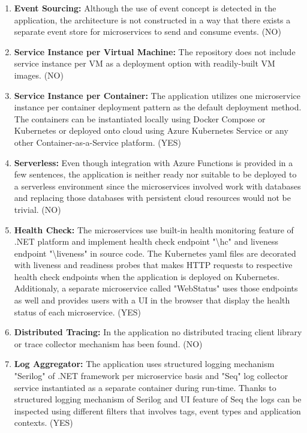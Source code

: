 \documentclass{Configuration_Files/PoliMi3i_thesis}
\begin{document}
\begin{enumerate}
    \item \textbf{Event Sourcing:} Although the use of event concept is detected in the application, the architecture is not constructed in a way that there exists a separate event store for microservices to send and consume events. (NO)
    
    \item \textbf{Service Instance per Virtual Machine:} The repository does not include service instance per VM as a deployment option with readily-built VM images. (NO)

    \item \textbf{Service Instance per Container:} The application utilizes one microservice instance per container deployment pattern as the default deployment method.
    The containers can be instantiated locally using Docker Compose or Kubernetes or deployed onto cloud using Azure Kubernetes Service or any other Container-as-a-Service platform. (YES)
    
    \item \textbf{Serverless:} Even though integration with Azure Functions is provided in a few sentences, the application is neither ready nor suitable to be deployed to a serverless environment since the microservices involved work with databases and replacing those databases with persistent cloud resources would not be trivial. (NO)
    
    \item \textbf{Health Check:} The microservices use built-in health monitoring feature of .NET platform and implement health check endpoint "\textbackslash hc" and liveness endpoint "\textbackslash liveness" in source code.
    The Kubernetes yaml files are decorated with liveness and readiness probes that makes HTTP requests to respective health check endpoints when the application is deployed on Kubernetes.
    Additionaly, a separate microservice called "WebStatus" uses those endpoints as well and provides users with a UI in the browser that display the health status of each microservice. (YES)
    
    \item \textbf{Distributed Tracing:} In the application no distributed tracing client library or trace collector mechanism has been found. (NO)
    
    \item \textbf{Log Aggregator:} The application uses structured logging mechanism "Serilog" of .NET framework per microservice basis and "Seq" log collector service instantiated as a separate container during run-time.
    Thanks to structured logging mechanism of Serilog and UI feature of Seq the logs can be inspected using different filters that involves tags, event types and application contexts. (YES)
    

\end{enumerate}
\end{document}

